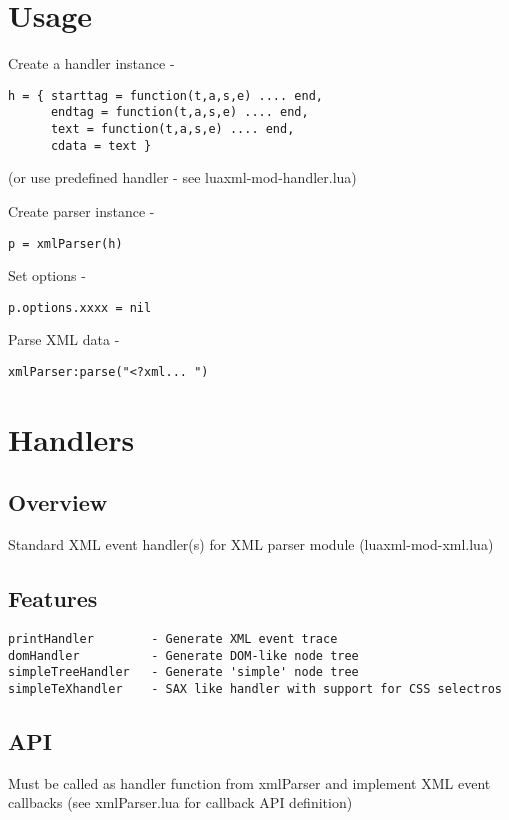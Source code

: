 \documentclass{ltxdoc}
\begin{document}
\section{Usage}

Create a handler instance -

\begin{verbatim}
h = { starttag = function(t,a,s,e) .... end,
      endtag = function(t,a,s,e) .... end,
      text = function(t,a,s,e) .... end,
      cdata = text }
\end{verbatim}
(or use predefined handler - see luaxml-mod-handler.lua)

Create parser instance -

\begin{verbatim}
p = xmlParser(h)
\end{verbatim}
Set options -

\begin{verbatim}
p.options.xxxx = nil
\end{verbatim}
Parse XML data -

\begin{verbatim}
xmlParser:parse("<?xml... ")
\end{verbatim}
\section{Handlers}\label{sec:handlers}

\subsection{Overview}

Standard XML event handler(s) for XML parser module (luaxml-mod-xml.lua)

\subsection{Features}

\begin{verbatim}
printHandler        - Generate XML event trace
domHandler          - Generate DOM-like node tree
simpleTreeHandler   - Generate 'simple' node tree
simpleTeXhandler    - SAX like handler with support for CSS selectros
\end{verbatim}
\subsection{API}

Must be called as handler function from xmlParser and implement XML
event callbacks (see xmlParser.lua for callback API definition)
\end{document}
